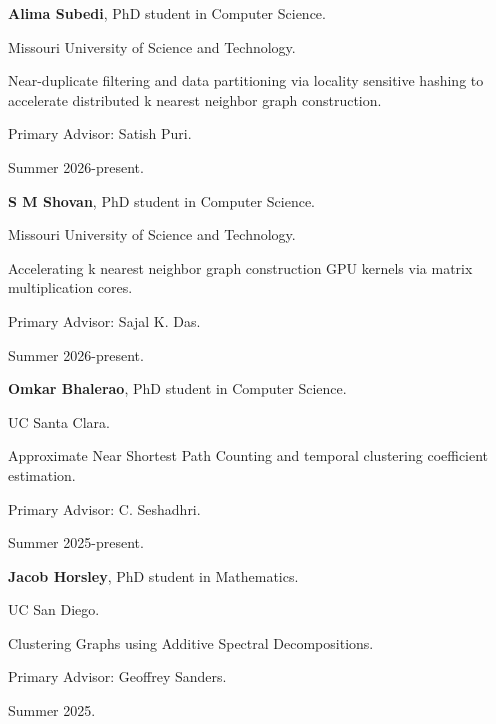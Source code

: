 \begin{innerlist}

  \item[] \textbf{Alima Subedi},
  PhD student in Computer Science.
  \begin{innerlist}
    \item[-] Missouri University of Science and Technology.
    \item[-] Near-duplicate filtering and data partitioning via locality sensitive hashing to accelerate distributed k nearest neighbor graph construction.
    \item[-] Primary Advisor: Satish Puri.
    \item[-] Summer 2026-present.
  \end{innerlist}

  \item[] \textbf{S M Shovan},
  PhD student in Computer Science.
  \begin{innerlist}
    \item[-] Missouri University of Science and Technology.
    \item[-] Accelerating k nearest neighbor graph construction GPU kernels via matrix multiplication cores.
    \item[-] Primary Advisor: Sajal K. Das.
    \item[-] Summer 2026-present.
  \end{innerlist}

  \item[] \textbf{Omkar Bhalerao},
  PhD student in Computer Science.
  \begin{innerlist}
    \item[-] UC Santa Clara.
    \item[-] Approximate Near Shortest Path Counting and temporal clustering coefficient estimation. 
    \item[-] Primary Advisor: C. Seshadhri.
    \item[-] Summer 2025-present.
  \end{innerlist}

  \item[] \textbf{Jacob Horsley},
  PhD student in Mathematics.
  \begin{innerlist}
    \item[-] UC San Diego.
    \item[-] Clustering Graphs using Additive Spectral Decompositions.
    \item[-] Primary Advisor: Geoffrey Sanders.
    \item[-] Summer 2025.
  \end{innerlist}


\end{innerlist}

